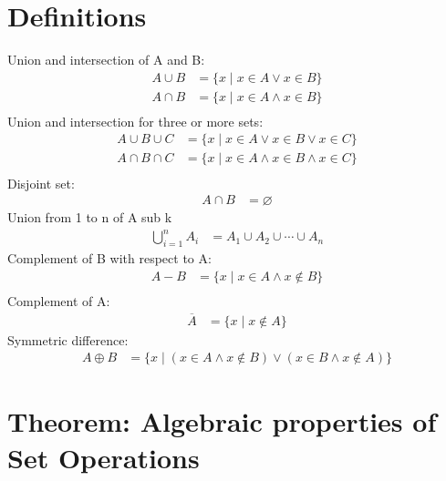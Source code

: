 \documentclass{article}  %
\theoremstyle{definition}
\begin{document}
\section{Definitions}
Union and intersection of A and B:
\[
\begin{aligned}
    A \cup B &= \{x \mid x \in A \lor x \in B\} \\
    A \cap B &= \{x \mid x \in A \land x \in B\} \\
\end{aligned}
\]
Union and intersection for three or more sets:
\[
\begin{aligned}
    A \cup B \cup C &= \{x \mid x \in A \lor x \in B \lor x \in C\} \\
    A \cap B \cap C&= \{x \mid x \in A \land x \in B \land x \in C\} \\
\end{aligned}
\]
Disjoint set:
\[
\begin{aligned}
    A \cap B &= \varnothing
\end{aligned}
\]
Union from 1 to n of A sub k
\[
\begin{aligned}
    \bigcup_{i=1}^{n} A_i &= A_{1} \cup A_{2} \cup \cdots \cup A_{n}
\end{aligned}
\]
Complement of B with respect to A:
\[
\begin{aligned}
    A - B &= \{x \mid x \in A \land x \notin B\} \\
\end{aligned}
\]
Complement of A:
\[
\begin{aligned}
   \overline{A} &= \{x \mid x\notin A\}
\end{aligned}
\]
Symmetric difference:
\[
\begin{aligned}
    A \oplus B &= \{x \mid (x \in A \land x \notin B) \lor (x \in B \land x \notin A)\}
\end{aligned}
\]


\section{Theorem: Algebraic properties of Set Operations}
\end{document}
